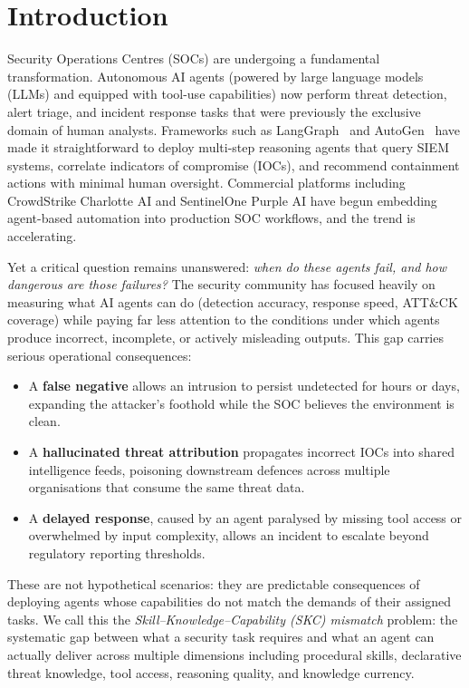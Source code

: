 \section{Introduction}

Security Operations Centres (SOCs) are undergoing a fundamental transformation.
Autonomous AI agents (powered by large language models (LLMs) and equipped
with tool-use capabilities) now perform threat detection, alert triage,
and incident response tasks that were previously the exclusive domain of
human analysts. Frameworks such as
LangGraph~\cite{langgraph2024} and AutoGen~\cite{wu2023autogen} have made it
straightforward to deploy multi-step reasoning agents that query SIEM systems,
correlate indicators of compromise (IOCs), and recommend containment actions
with minimal human oversight. Commercial platforms including CrowdStrike
Charlotte AI and SentinelOne Purple AI have begun embedding agent-based
automation into production SOC workflows, and the trend is accelerating.

Yet a critical question remains unanswered: \textit{when do these agents fail,
and how dangerous are those failures?} The security community has focused
heavily on measuring what AI agents can do (detection accuracy, response
speed, ATT\&CK coverage) while paying far less attention to the conditions
under which agents produce incorrect, incomplete, or actively misleading
outputs. This gap carries serious operational consequences:

\begin{itemize}[noitemsep, leftmargin=*]
  \item A \textbf{false negative} allows an intrusion to persist undetected
    for hours or days, expanding the attacker's foothold while the SOC
    believes the environment is clean.
  \item A \textbf{hallucinated threat attribution} propagates incorrect IOCs
    into shared intelligence feeds, poisoning downstream defences across
    multiple organisations that consume the same threat data.
  \item A \textbf{delayed response}, caused by an agent paralysed by missing
    tool access or overwhelmed by input complexity, allows an incident to
    escalate beyond regulatory reporting thresholds.
\end{itemize}

These are not hypothetical scenarios: they are predictable consequences of
deploying agents whose capabilities do not match the demands of their assigned
tasks. We call this the \textit{Skill--Knowledge--Capability (SKC) mismatch}
problem: the systematic gap between what a security task requires and what
an agent can actually deliver across multiple dimensions including procedural
skills, declarative threat knowledge, tool access, reasoning quality, and
knowledge currency.


